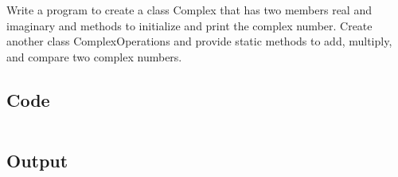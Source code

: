 \documentclass[../main.tex]{subfiles}
\begin{document}
Write a program to create a class Complex that has two members real and
imaginary and methods to initialize and print the complex number. Create
another class ComplexOperations and provide static methods to add, multiply,
and compare two complex numbers.

\subsection{Code}
\inputminted[frame=lines, breaklines, breakanywhere, numberblanklines=false]{java}{./programs/prog2/Complex.java}

\subsection{Output}
\end{document}
